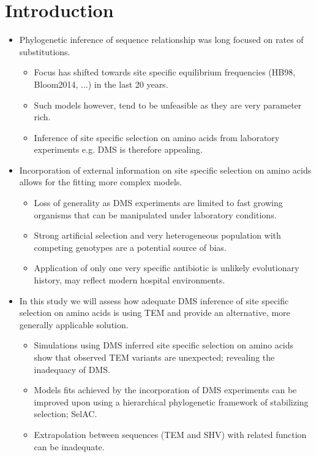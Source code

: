 \documentclass[12pt]{article}
\begin{document}
\section*{Introduction}
\begin{itemize}
	\item Phylogenetic inference of sequence relationship was long focused on rates of substitutions.
	\begin{itemize}
		\item Focus has shifted towards site specific equilibrium frequencies (HB98, Bloom2014, ...) in the last 20 years.
		\item Such models however, tend to be unfeasible as they are very parameter rich.
		\item Inference of site specific selection on amino acids from laboratory experiments e.g. DMS is therefore appealing.
	\end{itemize}

	\item Incorporation of external information on site specific selection on amino acids allows for the fitting more complex models.
	\begin{itemize}
		\item Loss of generality as DMS experiments are limited to fast growing organisms that can be manipulated under laboratory conditions.
		\item Strong artificial selection and very heterogeneous population with competing genotypes are a potential source of bias.
		\item Application of only one very specific antibiotic is unlikely evolutionary history, may reflect modern hospital environments.
	\end{itemize}

	\item In this study we will assess how adequate DMS inference of site specific selection on amino acids is using TEM and provide an alternative, more generally applicable solution.
	\begin{itemize}
		\item Simulations using DMS inferred site specific selection on amino acids show that observed TEM variants are unexpected; revealing the inadequacy of DMS.
		\item Models fits achieved by the incorporation of DMS experiments can be improved upon using a hierarchical phylogenetic framework of stabilizing selection; SelAC.
		\item Extrapolation between sequences (TEM and SHV) with related function can be inadequate.
	\end{itemize}
\end{itemize}
\end{document}
